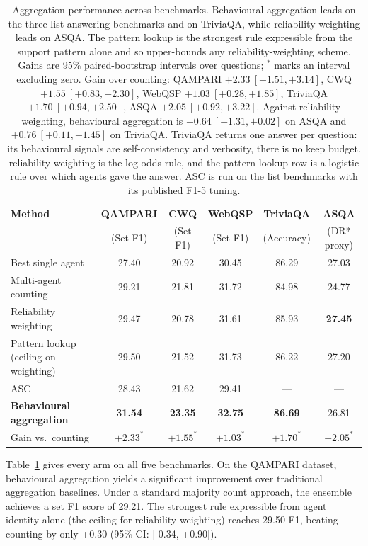 \documentclass[11pt]{article}
\begin{document}
\begin{table}[t]
\centering
\caption{Aggregation performance across benchmarks. Behavioural aggregation leads on the three list-answering benchmarks and on TriviaQA, while reliability weighting leads on ASQA. The pattern lookup is the strongest rule expressible from the support pattern alone and so upper-bounds any reliability-weighting scheme. Gains are 95\% paired-bootstrap intervals over questions; $^*$ marks an interval excluding zero. Gain over counting: QAMPARI $+2.33\ [+1.51, +3.14]$, CWQ $+1.55\ [+0.83, +2.30]$, WebQSP $+1.03\ [+0.28, +1.85]$, TriviaQA $+1.70\ [+0.94, +2.50]$, ASQA $+2.05\ [+0.92, +3.22]$. Against reliability weighting, behavioural aggregation is $-0.64\ [-1.31, +0.02]$ on ASQA and $+0.76\ [+0.11, +1.45]$ on TriviaQA. TriviaQA returns one answer per question: its behavioural signals are self-consistency and verbosity, there is no keep budget, reliability weighting is the log-odds rule, and the pattern-lookup row is a logistic rule over which agents gave the answer. ASC is run on the list benchmarks with its published F1-5 tuning.}
\label{tab:main}
\begin{tabular}{lccccc}
\toprule
\textbf{Method} & \textbf{QAMPARI} & \textbf{CWQ} & \textbf{WebQSP} & \textbf{TriviaQA} & \textbf{ASQA} \\
 & (Set F1) & (Set F1) & (Set F1) & (Accuracy) & (DR* proxy) \\
\midrule
Best single agent & 27.40 & 20.92 & 30.45 & 86.29 & 27.03 \\
Multi-agent counting & 29.21 & 21.81 & 31.72 & 84.98 & 24.77 \\
Reliability weighting & 29.47 & 20.78 & 31.61 & 85.93 & \textbf{27.45} \\
Pattern lookup (ceiling on weighting) & 29.50 & 21.52 & 31.73 & 86.22 & 27.20 \\
ASC & 28.43 & 21.62 & 29.41 & --- & --- \\
\textbf{Behavioural aggregation} & \textbf{31.54} & \textbf{23.35} & \textbf{32.75} & \textbf{86.69} & 26.81 \\
\midrule
Gain vs.\ counting & $+2.33^*$ & $+1.55^*$ & $+1.03^*$ & $+1.70^*$ & $+2.05^*$ \\
\bottomrule
\end{tabular}
\end{table}


Table~\ref{tab:main} gives every arm on all five benchmarks. On the QAMPARI dataset, behavioural aggregation yields a significant improvement over traditional aggregation baselines. Under a standard majority count approach, the ensemble achieves a set F1 score of 29.21. The strongest rule expressible from agent identity alone (the ceiling for reliability weighting) reaches 29.50 F1, beating counting by only +0.30 (95\% CI: [-0.34, +0.90]).
\end{document}
